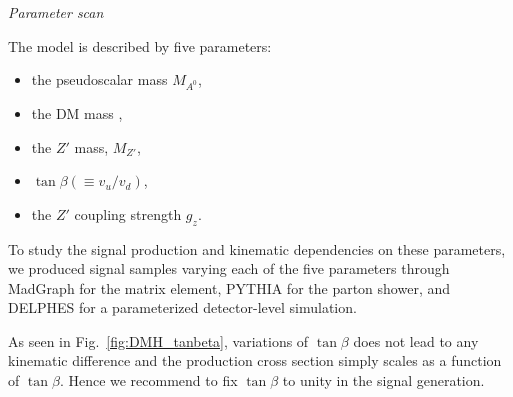  
 \textit{Parameter scan}
 
 The model is described by five parameters:
 \begin{itemize}
 	\item the pseudoscalar mass $M_{A^0}$,
 	\item the DM mass \mdm, 	 
 	\item the $Z'$ mass, $M_{Z'}$,
    \item $\tan{\beta} (\equiv v_u/v_d)$,
 	\item the $Z'$ coupling strength $g_z$. 
 \end{itemize}

 To study the signal production and kinematic dependencies on these parameters, 
 we produced signal samples varying each of the five parameters through 
 MadGraph for the matrix element, PYTHIA for the parton shower, and DELPHES\cite{deFavereau:2013fsa} 
for a parameterized detector-level simulation.
 
 As seen in Fig.~\ref{fig:DMH_tanbeta}, variations of $\tan{\beta}$ does not lead to any kinematic 
 difference and the production cross section simply scales as a function of $\tan{\beta}$. Hence 
we recommend to fix $\tan{\beta}$ to unity in the signal generation. 


